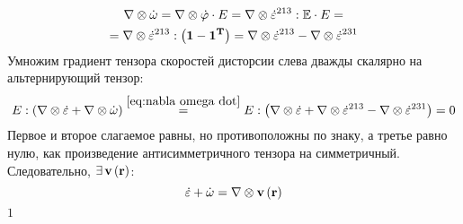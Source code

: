 \documentclass[a4papper, 14pt]{book}
\renewcommand{\epsilon}{\ensuremath{\varepsilon}}
\renewcommand{\phi}{\ensuremath{\varphi}}
\newcommand{\diad}{\ensuremath\otimes}
\newcommand{\lf}{\ensuremath \left(}
\newcommand{\ri}{\ensuremath \right)}
\newcommand{\mf}[1]{\ensuremath\mathbf{#1}}
\theoremstyle{plain} %
\theoremstyle{definition} %
\theoremstyle{remark} %
\begin{document}
	\begin{multline}\label{eq:nabla omega dot}
	\nabla\diad\dot{\omega} = \nabla\diad\dot{\mf{\phi}}\cdot E = \nabla\diad\dot{\epsilon}^{213}:\mathbb{E}\cdot E =\\= \nabla\diad\dot{\epsilon}^{213}:\lf\mathbf{1} - \mathbf{1^T} \ri = \nabla\diad\dot{\epsilon}^{213} - \nabla\diad\dot{\epsilon}^{231}
	\end{multline}
	Умножим градиент тензора скоростей дисторсии слева дважды скалярно на альтернирующий тензор:
	\begin{equation}
	E:\lf \nabla\diad\dot{\epsilon} + \nabla\diad\dot{\omega}\ri \stackrel{\eqref{eq:nabla omega dot}}=E:\lf\nabla\diad\dot{\epsilon} + \nabla\diad\dot{\epsilon}^{213} - \nabla\diad\dot{\epsilon}^{231}\ri = 0
	\end{equation}
	Первое и второе слагаемое равны, но противоположны по знаку, а третье равно нулю, как произведение антисимметричного тензора на симметричный. Следовательно, $\exists\,\mf{v}\lf\mf{r}\ri$:
	\begin{equation}
	\dot{\epsilon} + \dot{\omega}=\nabla\diad\mf{v}\lf\mf{r}\ri 
	\end{equation}
	$\mathfrak{ 1}$
\end{document}
